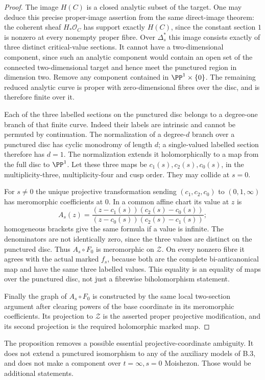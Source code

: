 \begin{proof}
The image $H(C)$ is a closed analytic subset of the target.
One may deduce this precise proper-image assertion from the same
direct-image theorem: the coherent sheaf
$H_*\mathcal O_C$ has support exactly $H(C)$, since the
constant section $1$ is nonzero at every nonempty proper fibre.
Over $\Delta_s^*$ this image consists exactly of three distinct
critical-value sections. It cannot have a two-dimensional
component, since such an analytic component would contain an
open set of the connected two-dimensional target and hence meet
the punctured region in dimension two. Remove any component
contained in $\PP^1\times\{0\}$. The remaining reduced
analytic curve is proper with zero-dimensional fibres over the
disc, and is therefore finite over it.

Each of the three labelled sections on the punctured disc belongs
to a degree-one branch of that finite curve. Indeed their labels
are intrinsic and cannot be permuted by continuation. The
normalization of a degree-$d$ branch over a punctured disc has
cyclic monodromy of length $d$; a single-valued labelled section
therefore has $d=1$. The normalization extends it holomorphically
to a map from the full disc to $\PP^1$. Let these three maps be
$c_1(s),c_2(s),c_0(s)$, in the multiplicity-three,
multiplicity-four and cusp order. They may collide at $s=0$.

For $s\ne0$ the unique projective transformation sending
$(c_1,c_2,c_0)$ to $(0,1,\infty)$ has meromorphic coefficients
at $0$. In a common affine chart its value at $z$ is
\[
 A_s(z)=
 \frac{(z-c_1(s))(c_2(s)-c_0(s))}
      {(z-c_0(s))(c_2(s)-c_1(s))};
\]
homogeneous brackets give the same formula if a value is infinite.
The denominators are not identically zero, since the three values
are distinct on the punctured disc. Thus $A_s\circ F_0$ is
meromorphic on $\mathcal Z$. On every nonzero fibre it agrees
with the actual marked $f_s$, because both are the complete
bi-anticanonical map and have the same three labelled values.
This equality is an equality of maps over the punctured disc,
not just a fibrewise biholomorphism statement.

Finally the graph of $A_s\circ F_0$ is constructed by the same
local two-section argument after clearing powers of the base
coordinate in its meromorphic coefficients. Its projection to
$\mathcal Z$ is the asserted proper projective modification,
and its second projection is the required holomorphic marked map.
\end{proof}

The proposition removes a possible essential projective-coordinate
ambiguity. It does not extend a punctured isomorphism to any of
the auxiliary models of B.3, and does not make a component over
$t=\infty,s=0$ Moishezon. Those would be additional statements.
